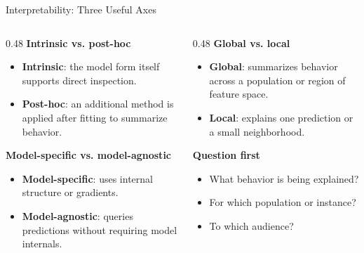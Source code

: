 \begin{frame}{Interpretability: Three Useful Axes}
\begin{columns}
\begin{column}{0.48\textwidth}
\textbf{Intrinsic vs. post-hoc}
\begin{itemize}
  \item \textbf{Intrinsic}: the model form itself supports direct inspection.
  \item \textbf{Post-hoc}: an additional method is applied after fitting to summarize behavior.
\end{itemize}

\textbf{Model-specific vs. model-agnostic}
\begin{itemize}
  \item \textbf{Model-specific}: uses internal structure or gradients.
  \item \textbf{Model-agnostic}: queries predictions without requiring model internals.
\end{itemize}
\end{column}

\begin{column}{0.48\textwidth}
\textbf{Global vs. local}
\begin{itemize}
  \item \textbf{Global}: summarizes behavior across a population or region of feature space.
  \item \textbf{Local}: explains one prediction or a small neighborhood.
\end{itemize}

\textbf{Question first}
\begin{itemize}
  \item What behavior is being explained?
  \item For which population or instance?
  \item To which audience?
\end{itemize}
\end{column}
\end{columns}
\end{frame}

